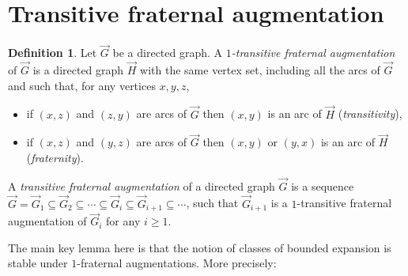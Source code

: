 \documentclass[a4paper]{amsart}
\theoremstyle{definition}
\newtheorem{definition}{Definition}[section]
\theoremstyle{remark}
\def\vG{\vec{G}}
\def\vH{\vec{H}}
\begin{document}
\section{Transitive fraternal augmentation}
\label{sec:aug}
\begin{definition}
Let $\vG$ be a directed graph. A {\em $1$-transitive fraternal augmentation} of $\vG$
is a directed graph $\vH$ with the same vertex set, including all the
arcs of $\vG$ and such that, for any vertices $x,y,z$,
\begin{itemize}
\item if $(x,z)$ and $(z,y)$ are arcs of $\vG$ then $(x,y)$ is an arc
  of $\vH$ ({\em transitivity}),
\item  if $(x,z)$ and $(y,z)$ are arcs of $\vG$ then $(x,y)$ or $(y,x)$ is an arc
  of $\vH$ ({\em fraternity}).
\end{itemize}

A {\em transitive fraternal augmentation} of a directed graph $\vG$ is a sequence
$\vG=\vG_1\subseteq\vG_2\subseteq\dotsb\subseteq \vG_i\subseteq\vG_{i+1}\subseteq\dotsb$,
such that $\vG_{i+1}$ is a $1$-transitive fraternal augmentation of $\vG_i$ for any
$i\geq 1$.
\end{definition}

The main key lemma here is that the notion of classes of bounded
 expansion is stable under
 $1$-fraternal augmentations.
More precisely:
\end{document}
